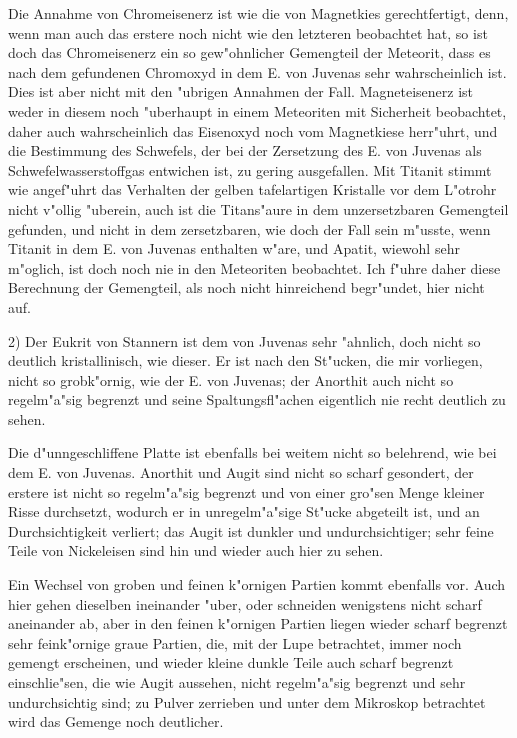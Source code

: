 \documentclass[a4paper, 11pt, oneside, german]{article}
\begin{document}
Die Annahme von Chromeisenerz ist wie die von Magnetkies gerechtfertigt, denn, wenn man auch das erstere noch nicht wie den letzteren beobachtet hat, so ist doch das Chromeisenerz ein so gew"ohnlicher Gemengteil der Meteorit, dass es nach dem gefundenen Chromoxyd in dem E. von Juvenas sehr wahrscheinlich ist. Dies ist aber nicht mit den "ubrigen Annahmen der Fall. Magneteisenerz ist weder in diesem noch "uberhaupt in einem Meteoriten mit Sicherheit beobachtet, daher auch wahrscheinlich das Eisenoxyd noch vom Magnetkiese herr"uhrt, und die Bestimmung des Schwefels, der bei der Zersetzung des E. von Juvenas als Schwefelwasserstoffgas entwichen ist, zu gering ausgefallen. Mit Titanit stimmt wie angef"uhrt das Verhalten der gelben tafelartigen Kristalle vor dem L"otrohr nicht v"ollig "uberein, auch ist die Titans"aure in dem unzersetzbaren Gemengteil gefunden, und nicht in dem zersetzbaren, wie doch der Fall sein m"usste, wenn Titanit in dem E. von Juvenas enthalten w"are, und Apatit, wiewohl sehr m"oglich, ist doch noch nie in den Meteoriten beobachtet. Ich f"uhre daher diese Berechnung der Gemengteil, als noch nicht hinreichend begr"undet, hier nicht auf.

2) Der Eukrit von Stannern ist dem von Juvenas sehr "ahnlich, doch nicht so deutlich kristallinisch, wie dieser. Er ist nach den St"ucken, die mir vorliegen, nicht so grobk"ornig, wie der E. von Juvenas; der Anorthit auch nicht so regelm"a"sig begrenzt und seine Spaltungsfl"achen eigentlich nie recht deutlich zu sehen.

Die d"unngeschliffene Platte ist ebenfalls bei weitem nicht so belehrend, wie bei dem E. von Juvenas. Anorthit und Augit sind nicht so scharf gesondert, der erstere ist nicht so regelm"a"sig begrenzt und von einer gro"sen Menge kleiner Risse durchsetzt, wodurch er in unregelm"a"sige St"ucke abgeteilt ist, und an Durchsichtigkeit verliert; das Augit ist dunkler und undurchsichtiger; sehr feine Teile von Nickeleisen sind hin und wieder auch hier zu sehen.

Ein Wechsel von groben und feinen k"ornigen Partien kommt ebenfalls vor. Auch hier gehen dieselben ineinander "uber, oder schneiden wenigstens nicht scharf aneinander ab, aber in den feinen k"ornigen Partien liegen wieder scharf begrenzt sehr feink"ornige graue Partien, die, mit der Lupe betrachtet, immer noch gemengt erscheinen, und wieder kleine dunkle Teile auch scharf begrenzt einschlie"sen, die wie Augit aussehen, nicht regelm"a"sig begrenzt und sehr undurchsichtig sind; zu Pulver zerrieben und unter dem Mikroskop betrachtet wird das Gemenge noch deutlicher.
\end{document}
